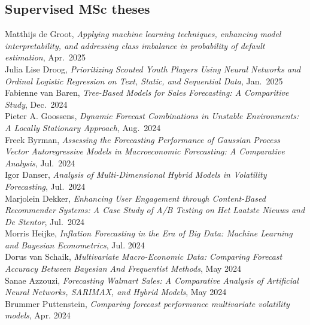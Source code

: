 \documentclass[margin,line]{resume}
\begin{document}
\begin{resume}
\section{\mysidestyle Supervised MSc theses} 
Matthijs de Groot, \textit{Applying machine learning techniques, enhancing model interpretability, and addressing class imbalance in probability of default estimation}, Apr.\ 2025	\vspace{2mm}\\
Julia Lise Droog, \textit{Prioritizing Scouted Youth Players Using Neural Networks and Ordinal Logistic Regression on Text, Static, and Sequential Data}, Jan.\ 2025	\vspace{2mm}\\
Fabienne van Baren, \textit{Tree-Based Models for Sales Forecasting: A Comparitive Study}, Dec.\ 2024	\vspace{2mm}\\
Pieter A. Goossens, \textit{Dynamic Forecast Combinations in Unstable Environments: A Locally Stationary Approach}, Aug.\ 2024	\vspace{2mm}\\
Freek Byrman, \textit{Assessing the Forecasting Performance of Gaussian Process Vector Autoregressive Models in Macroeconomic Forecasting: A Comparative Analysis}, Jul.\ 2024	\vspace{2mm}\\
Igor Danser, \textit{Analysis of Multi-Dimensional Hybrid Models in Volatility Forecasting}, Jul.\ 2024	\vspace{2mm}\\
Marjolein Dekker, \textit{Enhancing User Engagement through Content-Based Recommender Systems: A Case Study of A/B Testing on Het Laatste Nieuws and De Stentor},	Jul.\ 2024	\vspace{2mm}\\
Morris Heijke, \textit{Inflation Forecasting in the Era of Big Data: Machine Learning and Bayesian Econometrics},	Jul. 2024 \vspace{2mm}\\
Dorus van Schaik, \textit{Multivariate Macro-Economic Data: Comparing Forecast Accuracy Between Bayesian And Frequentist Methods},	May 2024	\vspace{2mm}\\
Sanae Azzouzi, \textit{Forecasting Walmart Sales: A Comparative Analysis of Artificial Neural Networks, SARIMAX, and Hybrid Models}, May 2024	 \vspace{2mm}\\
Brummer Puttenstein, \textit{Comparing forecast performance multivariate volatility models},	Apr. 2024 \vspace{2mm}\\

\end{resume}
\end{document}
